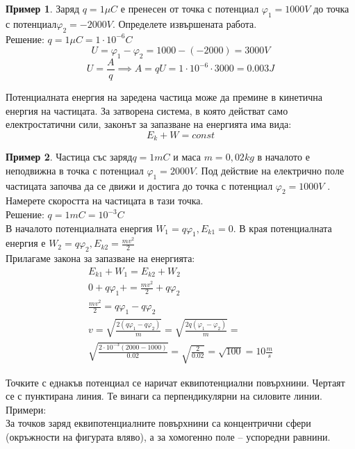 \documentclass[fleqn, 12pt]{article}
\theoremstyle{definition}
\newtheorem{example}{Пример}[subsection]
\begin{document}
\begin{example}
Заряд $q = 1 \mu C$ е пренесен от точка с потенциал $\varphi_1 = 1000 V$ до точка с
потенциал$\varphi_2 = -2000 V$. Определете извършената работа. \\
Решение: $q = 1 \mu C = 1 \cdot 10^{-6} C$
$$U = \varphi_1 - \varphi_2 = 1000 - (-2000) = 3000V$$
$$U = \frac{A}{q} \implies A = qU = 1 \cdot 10^{-6} \cdot 3000 = 0.003J$$
\end{example}
Потенциалната енергия на заредена частица може да премине в кинетична
енергия на частицата. За затворена система, в която действат само електростатични
сили, законът за запазване на енергията има вида: 
$$E_k + W = const$$
\begin{example}
Частица със заряд$q = 1  mC$ и маса $m = 0,02 kg$ в началото е неподвижна
в точка с потенциал $\varphi_1 = 2000 V$. Под действие на електрично поле частицата
започва да се движи и достига до точка с потенциал $\varphi_2 = 1000 V$ . Намерете
скоростта на частицата в тази точка.\\
Решение: $q = 1 mC = 10^{-3} C$\\
В началото потенциалната енергия $W_1 = q\varphi_1, E_{k1} = 0$.
В края потенциалната енергия е $W_2 = q\varphi_2, E_{k2} = \frac{mv^2}{2}$\\
Прилагаме закона за запазване на енергията:
\begin{gather*}
E_{k1} + W_1 = E_{k2} + W_2 \\
0 + q\varphi_1+ = \frac{mv^2}{2} + q\varphi_2 \\
\frac{mv^2}{2} = q\varphi_1- q\varphi_2 \\
v = \sqrt{\frac{2(q\varphi_1- q\varphi_2 )}{m}} = \sqrt{\frac{2q(\varphi_1- \varphi_2 )}{m}} =  \\
\sqrt{\frac{2 \cdot 10^{-3}(2000 - 1000 )}{0.02}} = \sqrt{\frac{2}{0.02}} = \sqrt{100} = 10 \frac{m}{s}
\end{gather*}
\end{example}
Точките с еднакъв потенциал се наричат еквипотенциални повърхнини. Чертаят
се с пунктирана линия. Те винаги са перпендикулярни на силовите линии. Примери: \\
За точков заряд еквипотенциалните повърхнини са концентрични сфери
(окръжности на фигурата вляво), а за хомогенно поле – успоредни равнини. 
\end{document}
